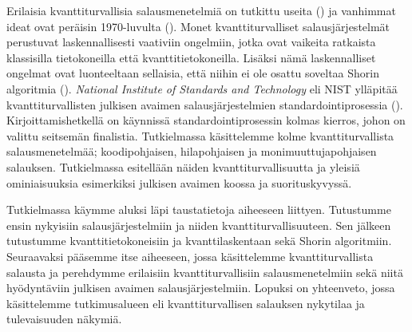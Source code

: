 Erilaisia kvanttiturvallisia salausmenetelmiä on tutkittu useita (\cite{mavroeidis2018impact}) ja vanhimmat ideat ovat peräisin 1970-luvulta (\cite{repka2014overview}). Monet kvanttiturvalliset salausjärjestelmät perustuvat laskennallisesti vaativiin ongelmiin, jotka ovat vaikeita ratkaista klassisilla tietokoneilla että kvanttitietokoneilla. %
 Lisäksi nämä laskennalliset ongelmat ovat luonteeltaan sellaisia, että niihin ei ole osattu soveltaa Shorin algoritmia (\cite{bernstein2017post}). \emph{National Institute of Standards and Technology} eli NIST ylläpitää kvanttiturvallisten julkisen avaimen salausjärjestelmien standardointiprosessia (\cite{alagic2020status}). Kirjoittamishetkellä on käynnissä standardointiprosessin kolmas kierros, johon on valittu seitsemän finalistia. Tutkielmassa käsittelemme kolme kvanttiturvallista salausmenetelmää; koodipohjaisen, hilapohjaisen ja monimuuttujapohjaisen salauksen. Tutkielmassa esitellään näiden kvanttiturvallisuutta ja yleisiä ominiaisuuksia esimerkiksi julkisen avaimen koossa ja suorituskyvyssä.
 
Tutkielmassa käymme aluksi läpi taustatietoja aiheeseen liittyen. Tutustumme ensin nykyisiin salausjärjestelmiin ja niiden kvanttiturvallisuuteen. Sen jälkeen tutustumme kvanttitietokoneisiin ja kvanttilaskentaan sekä Shorin algoritmiin. Seuraavaksi pääsemme itse aiheeseen, jossa käsittelemme kvanttiturvallista salausta ja perehdymme erilaisiin kvanttiturvallisiin salausmenetelmiin sekä niitä hyödyntäviin julkisen avaimen salausjärjestelmiin. Lopuksi on yhteenveto, jossa käsittelemme tutkimusalueen eli kvanttiturvallisen salauksen nykytilaa ja tulevaisuuden näkymiä.